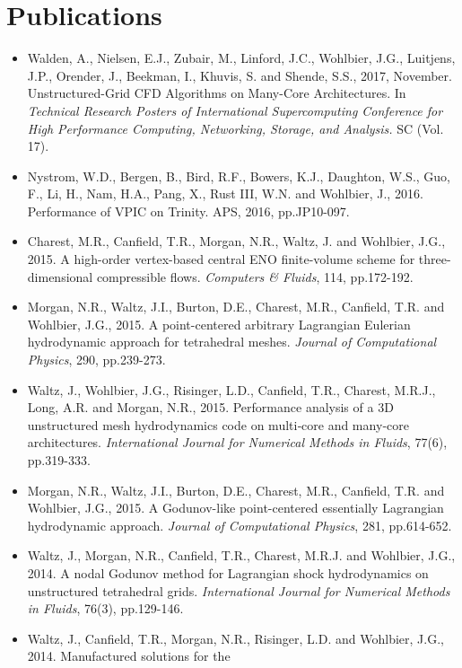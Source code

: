 \documentclass{muratcan_cv}
\begin{document}
\section{Publications}
\begin{itemize}
\footnotesize
\item Walden, A., Nielsen, E.J., Zubair, M., Linford, J.C., Wohlbier,
  J.G., Luitjens, J.P., Orender, J., Beekman, I., Khuvis, S. and Shende,
  S.S., 2017, November. Unstructured-Grid CFD Algorithms on Many-Core
  Architectures. In {\it Technical Research Posters of International
    Supercomputing Conference for High Performance Computing, Networking,
    Storage, and Analysis.} SC (Vol. 17).
\item Nystrom, W.D., Bergen, B., Bird, R.F., Bowers, K.J., Daughton,
  W.S., Guo, F., Li, H., Nam, H.A., Pang, X., Rust III, W.N. and
  Wohlbier, J., 2016. Performance of VPIC on Trinity. APS, 2016,
  pp.JP10-097.
\item Charest, M.R., Canfield, T.R., Morgan, N.R., Waltz, J. and
  Wohlbier, J.G., 2015. A high-order vertex-based central ENO
  finite-volume scheme for three-dimensional compressible
  flows. {\it Computers \& Fluids}, 114, pp.172-192.
\item Morgan, N.R., Waltz, J.I., Burton, D.E., Charest, M.R.,
  Canfield, T.R. and Wohlbier, J.G., 2015. A point-centered arbitrary
  Lagrangian Eulerian hydrodynamic approach for tetrahedral
  meshes. {\it Journal of Computational Physics}, 290, pp.239-273.
\item Waltz, J., Wohlbier, J.G., Risinger, L.D., Canfield, T.R.,
  Charest, M.R.J., Long, A.R. and Morgan, N.R., 2015. Performance
  analysis of a 3D unstructured mesh hydrodynamics code on multi‐core
  and many‐core architectures. {\it International Journal for Numerical
    Methods in Fluids}, 77(6), pp.319-333.
\item Morgan, N.R., Waltz, J.I., Burton, D.E., Charest, M.R.,
  Canfield, T.R. and Wohlbier, J.G., 2015. A Godunov-like
  point-centered essentially Lagrangian hydrodynamic approach. {\it Journal
    of Computational Physics}, 281, pp.614-652.
\item Waltz, J., Morgan, N.R., Canfield, T.R., Charest, M.R.J. and
  Wohlbier, J.G., 2014. A nodal Godunov method for Lagrangian shock
  hydrodynamics on unstructured tetrahedral grids. {\it International
    Journal for Numerical Methods in Fluids}, 76(3), pp.129-146.
\item Waltz, J., Canfield, T.R., Morgan, N.R., Risinger, L.D. and
  Wohlbier, J.G., 2014. Manufactured solutions for the

\end{itemize}
\end{document}
